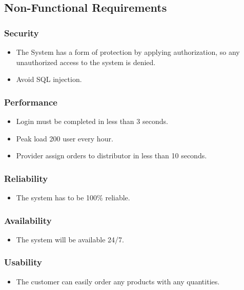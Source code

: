 \documentclass[12pt]{article}
\begin{document}
\subsection{ Non-Functional Requirements }

\subsubsection{ Security }
\begin{itemize}
	\item The System has a form of protection by applying authorization, so any unauthorized access to the system is denied.
	\item Avoid SQL injection.
\end{itemize}

\subsubsection{ Performance }
\begin{itemize}
	\item Login must be completed in less than 3 seconds.
	\item Peak load 200 user every hour.
	\item Provider assign orders to distributor in less than 10 seconds.
\end{itemize}

\subsubsection{ Reliability }
\begin{itemize}
	\item The system has to be 100\% reliable.
\end{itemize}

\subsubsection{ Availability }
\begin{itemize}
	\item The system will be available 24/7.
\end{itemize}

\subsubsection{ Usability }
\begin{itemize}
	\item The customer can easily order any products with any quantities.
\end{itemize}
\end{document}
